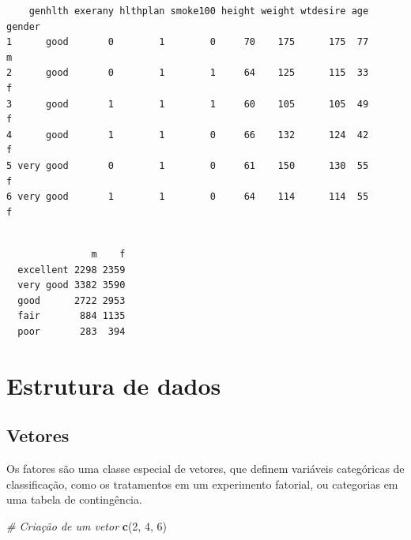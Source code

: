 \documentclass[12pt,brazil,oneside]{book}
\newenvironment{Shaded}{\begin{snugshade}}{\end{snugshade}}
\newcommand{\CommentTok}[1]{\textcolor[rgb]{0.56,0.35,0.01}{\textit{#1}}}
\newcommand{\DecValTok}[1]{\textcolor[rgb]{0.00,0.00,0.81}{#1}}
\newcommand{\KeywordTok}[1]{\textcolor[rgb]{0.13,0.29,0.53}{\textbf{#1}}}
\newcommand{\NormalTok}[1]{#1}
\newcommand{\OperatorTok}[1]{\textcolor[rgb]{0.81,0.36,0.00}{\textbf{#1}}}
\begin{document}
\begin{verbatim}
    genhlth exerany hlthplan smoke100 height weight wtdesire age gender
1      good       0        1        0     70    175      175  77      m
2      good       0        1        1     64    125      115  33      f
3      good       1        1        1     60    105      105  49      f
4      good       1        1        0     66    132      124  42      f
5 very good       0        1        0     61    150      130  55      f
6 very good       1        1        0     64    114      114  55      f
\end{verbatim}

\begin{Shaded}
\end{Shaded}

\begin{verbatim}
           
               m    f
  excellent 2298 2359
  very good 3382 3590
  good      2722 2953
  fair       884 1135
  poor       283  394
\end{verbatim}

\hypertarget{estrutura-de-dados}{%
\section{Estrutura de dados}\label{estrutura-de-dados}}

\hypertarget{vetores}{%
\subsection{Vetores}\label{vetores}}

Os fatores são uma classe especial de vetores, que definem variáveis categóricas de classificação, como os tratamentos em um experimento fatorial, ou categorias em uma tabela de contingência.

\begin{Shaded}
\begin{Highlighting}[]
\CommentTok{# Criação de um vetor}
\KeywordTok{c}\NormalTok{(}\DecValTok{2}\NormalTok{, }\DecValTok{4}\NormalTok{, }\DecValTok{6}\NormalTok{)}
\end{Highlighting}
\end{Shaded}
\end{document}

